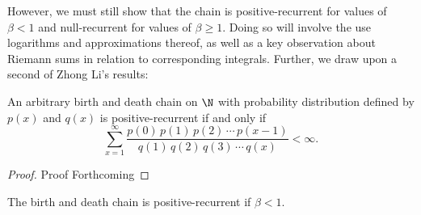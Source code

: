 However, we must still show that the chain is positive-recurrent for values of $\beta < 1$ and
null-recurrent for values of $\beta \geq 1$. Doing so will involve the use logarithms and approximations
thereof, as well as a key observation about Riemann sums in relation to corresponding integrals.
Further, we draw upon a second of Zhong Li's results:
\begin{proposition}
    An arbitrary birth and death chain on $\N$ with probability distribution defined by $p(x)$ and
    $q(x)$ is positive-recurrent if and only if
    \[
        \sum_{x=1}^{\infty} \frac{p(0)\, p(1)\, p(2)\, \cdots\, p(x-1)}{q(1)\, q(2)\, q(3)\, \cdots \,
        q(x)} < \infty.  
    \]
\end{proposition}
\begin{proof}
    Proof Forthcoming
\end{proof}
\begin{proposition}
    The birth and death chain is positive-recurrent if $\beta < 1$.
\end{proposition}
